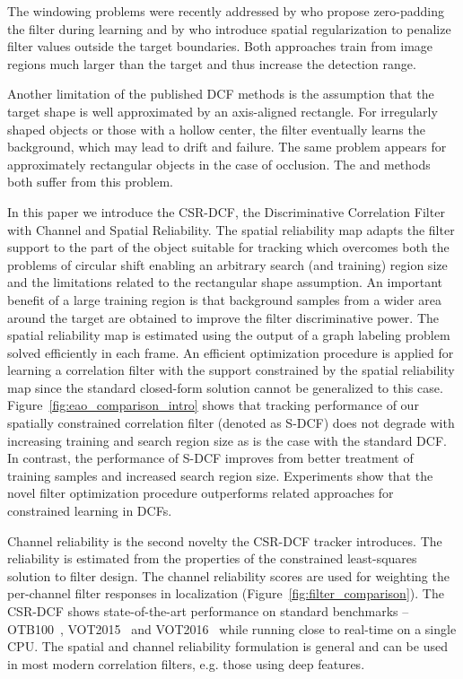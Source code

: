 \documentclass[twocolumn]{article}
\begin{document}
The windowing problems were recently addressed by \cite{cfwlb_cvpr2015} who propose zero-padding the filter during learning and by \cite{srdcf_iccv2015} who introduce spatial regularization to penalize filter values outside the target boundaries. Both approaches train from image regions much larger than the target and thus increase the detection range.

Another limitation of the published DCF methods is the assumption that the target shape is well approximated by an axis-aligned rectangle.  For irregularly shaped objects or those with a hollow center, the filter eventually learns the background, which may lead to drift and failure. The same problem appears for approximately rectangular objects in the case of occlusion. The \cite{cfwlb_cvpr2015} and \cite{srdcf_iccv2015} methods both suffer from this problem.
 
In this paper we introduce the CSR-DCF, the Discriminative Correlation Filter with Channel and Spatial Reliability.  The spatial reliability map adapts the filter support to the part of the object suitable for tracking which overcomes both the problems of circular shift enabling an arbitrary search (and training) region size and the limitations related to the rectangular shape assumption. An important benefit of a large training region is that background samples from a wider area around the target are obtained to improve the filter discriminative power. The spatial reliability map is estimated using the output of a graph labeling problem solved efficiently in each frame. An efficient optimization procedure is applied for learning a correlation filter with the support constrained by the spatial reliability map since the standard closed-form solution cannot be generalized to this case. Figure~\ref{fig:eao_comparison_intro} shows that tracking performance of our spatially constrained correlation filter (denoted as S-DCF) does not degrade with increasing training and search region size as is the case with the standard DCF. In contrast, the performance of S-DCF improves from better treatment of training samples and increased search region size. Experiments show that the novel filter optimization procedure outperforms related approaches for constrained learning in DCFs.

Channel reliability is the second novelty the CSR-DCF tracker introduces. The reliability is estimated from the properties of the constrained least-squares solution to filter design. The channel reliability scores are used for weighting the per-channel filter responses in localization (Figure~\ref{fig:filter_comparison}). 
The CSR-DCF shows state-of-the-art performance on standard benchmarks -- OTB100~\citep{otb_pami2015}, VOT2015~\citep{kristan_vot2015} and  VOT2016~\citep{kristan_vot2015} while running close to real-time on a single CPU. The spatial and channel reliability formulation is general and can be used in most modern correlation filters, e.g. those using deep features. 
\end{document}
